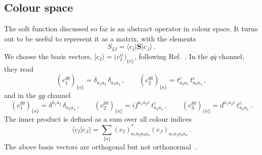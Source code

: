 \documentclass[a4paper,11pt]{article}
\newcommand{\qbar}{{\bar q}}
\newcommand{\bfS}{\bm{S}}
\numberwithin{equation}{section}
\begin{document}
\subsection{Colour space}

The soft function discussed so far is an abstract operator in colour space. It
turns out to be useful to represent it as a matrix, with the elements 
%
\begin{equation}
 S_{IJ} = \langle c_I | \bfS | c_J \rangle\,.
\end{equation}
%
We choose the basis vectors, $|c_I\rangle = \big(c_I^{i\bar i}\big)_{\{a\}}$,
following Ref.~\cite{Ferroglia:2012uy}.
%
In the $q\qbar$ channel, they read
%
%
%
\begin{equation}
  \left(c_1^{q\bar{q}}\right)_{\{a\}} = \delta_{a_1a_2} \,\delta_{a_3a_4}\,,
  \qquad
  \left(c_2^{q\bar{q}}\right)_{\{a\}} = t_{a_2a_1}^c \, t_{a_3a_4}^c\,,
  \label{eq:colour-basis-qq}
\end{equation}
%
and in the $gg$ channel
%
\begin{equation}
    \left(c_1^{gg}\right)_{\{a\}} = \delta^{a_1a_2} \, \delta_{a_3a_4} \, , 
    \qquad
    \left(c_2^{gg}\right)_{\{a\}} = i f^{a_1a_2c} \, t^{c}_{a_3a_4} \, , 
    \qquad
    \left(c_3^{gg}\right)_{\{a\}} = d^{a_1 a_2 c} \, t^c_{a_3a_4} \, .
  \label{eq:colour-basis-gg}
\end{equation}
%
The inner product is defined as a sum over all colour indices
%
\begin{equation}
  \langle c_I | c_J \rangle = 
  \sum_{\{a\}} 
  \left( c_I \right)^*_{a_1 a_2 a_3 a_4}
  \left( c_J \right)_{a_1 a_2 a_3 a_4}\,.
\end{equation}
%
The above basis vectors are orthogonal but not
orthonormal~\cite{Ferroglia:2012uy}.
\end{document}
